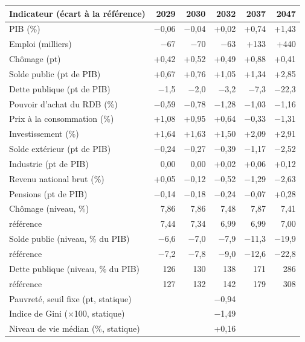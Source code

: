 \begin{tabular}{lrrrrr}
\toprule
Indicateur (écart à la référence) & 2029 & 2030 & 2032 & 2037 & 2047 \\
\midrule
PIB (\%) & $-$0{,}06 & $-$0{,}04 & +0{,}02 & +0{,}74 & +1{,}43 \\
Emploi (milliers) & $-$67 & $-$70 & $-$63 & +133 & +440 \\
Chômage (pt) & +0{,}42 & +0{,}52 & +0{,}49 & +0{,}88 & +0{,}41 \\
Solde public (pt de PIB) & +0{,}67 & +0{,}76 & +1{,}05 & +1{,}34 & +2{,}85 \\
Dette publique (pt de PIB) & $-$1{,}5 & $-$2{,}0 & $-$3{,}2 & $-$7{,}3 & $-$22{,}3 \\
Pouvoir d'achat du RDB (\%) & $-$0{,}59 & $-$0{,}78 & $-$1{,}28 & $-$1{,}03 & $-$1{,}16 \\
Prix à la consommation (\%) & +1{,}08 & +0{,}95 & +0{,}64 & $-$0{,}33 & $-$1{,}31 \\
Investissement (\%) & +1{,}64 & +1{,}63 & +1{,}50 & +2{,}09 & +2{,}91 \\
Solde extérieur (pt de PIB) & $-$0{,}24 & $-$0{,}27 & $-$0{,}39 & $-$1{,}17 & $-$2{,}52 \\
Industrie (pt de PIB) & 0{,}00 & 0{,}00 & +0{,}02 & +0{,}06 & +0{,}12 \\
Revenu national brut (\%) & +0{,}05 & $-$0{,}12 & $-$0{,}52 & $-$1{,}29 & $-$2{,}63 \\
Pensions (pt de PIB) & $-$0{,}14 & $-$0{,}18 & $-$0{,}24 & $-$0{,}07 & +0{,}28 \\
\midrule
Chômage (niveau, \%) & 7{,}86 & 7{,}86 & 7{,}48 & 7{,}87 & 7{,}41 \\
\quad référence & 7{,}44 & 7{,}34 & 6{,}99 & 6{,}99 & 7{,}00 \\
Solde public (niveau, \% du PIB) & $-$6{,}6 & $-$7{,}0 & $-$7{,}9 & $-$11{,}3 & $-$19{,}9 \\
\quad référence & $-$7{,}2 & $-$7{,}8 & $-$9{,}0 & $-$12{,}6 & $-$22{,}8 \\
Dette publique (niveau, \% du PIB) & 126 & 130 & 138 & 171 & 286 \\
\quad référence & 127 & 132 & 142 & 179 & 308 \\
\midrule
Pauvreté, seuil fixe (pt, statique) & \multicolumn{5}{c}{$-$0{,}94} \\
Indice de Gini ($\times$100, statique) & \multicolumn{5}{c}{$-$1{,}49} \\
Niveau de vie médian (\%, statique) & \multicolumn{5}{c}{+0{,}16} \\
\bottomrule
\end{tabular}
